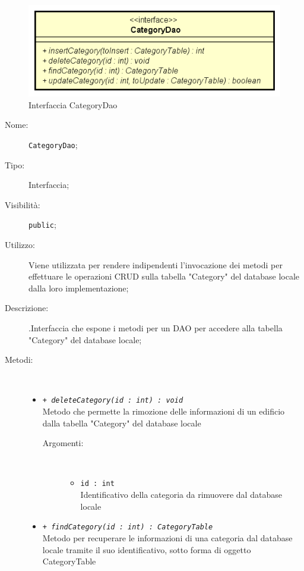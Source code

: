 \documentclass[../DefinizioneDiProdotto.tex]{subfiles}
\begin{document}
    \begin{figure}[H]
        \centering
        \includegraphics{img/CategoryDao.png}
        \caption{Interfaccia CategoryDao}\label{fig:model::dataaccess::dao::CategoryDao} 
    \end{figure}
    \begin{description}
\item[Nome:] \texttt{CategoryDao};
\item[Tipo:] Interfaccia;
\item[Visibilità:] \texttt{public};
\item[Utilizzo:] Viene utilizzata per rendere indipendenti l'invocazione dei metodi per effettuare le operazioni CRUD sulla tabella "Category" del database locale dalla loro implementazione;
\item[Descrizione:] .Interfaccia che espone i metodi per un DAO per accedere alla tabella "Category" del database locale;
\item[Metodi:] \
\begin{itemize}
\item \texttt{+ \textit{deleteCategory(id : int) : void}}\\
Metodo che permette la rimozione delle informazioni di un edificio dalla tabella "Category" del database locale
 \begin{description}
\item[Argomenti:] \
\begin{itemize}
\item \texttt{id : int}\\
Identificativo della categoria da rimuovere dal database locale\end{itemize}
\end{description}
\item \texttt{+ \textit{findCategory(id : int) : CategoryTable}}\\
Metodo per recuperare le informazioni di una categoria dal database locale tramite il suo identificativo, sotto forma di oggetto CategoryTable
 \begin{description}

\end{description}
\end{itemize}
\end{description}
\end{document}
